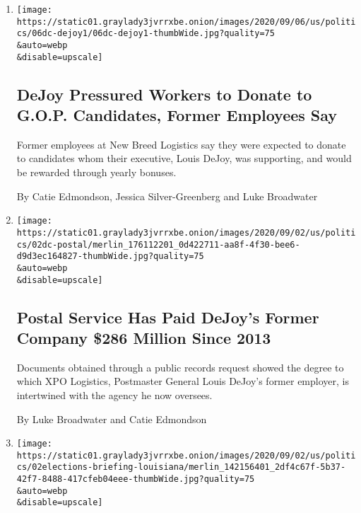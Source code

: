\begin{enumerate}
\def\labelenumi{\arabic{enumi}.}
\item
  \href{/2020/09/06/us/politics/dejoy-political-donations.html}{}

  \texttt{[image: https://static01.graylady3jvrrxbe.onion/images/2020/09/06/us/politics/06dc-dejoy1/06dc-dejoy1-thumbWide.jpg?quality=75\\\&auto=webp\\\&disable=upscale]}

  \hypertarget{dejoy-pressured-workers-to-donate-to-gop-candidates-former-employees-say}{%
  \subsection{DeJoy Pressured Workers to Donate to G.O.P. Candidates,
  Former Employees
  Say}\label{dejoy-pressured-workers-to-donate-to-gop-candidates-former-employees-say}}

  Former employees at New Breed Logistics say they were expected to
  donate to candidates whom their executive, Louis DeJoy, was
  supporting, and would be rewarded through yearly bonuses.

  By Catie Edmondson, Jessica Silver-Greenberg and Luke Broadwater
\item
  \href{/2020/09/02/us/politics/louis-dejoy-usps-paid.html}{}

  \texttt{[image: https://static01.graylady3jvrrxbe.onion/images/2020/09/02/us/politics/02dc-postal/merlin\_176112201\_0d422711-aa8f-4f30-bee6-d9d3ec164827-thumbWide.jpg?quality=75\\\&auto=webp\\\&disable=upscale]}

  \hypertarget{postal-service-has-paid-dejoys-former-company-286-million-since-2013}{%
  \subsection{Postal Service Has Paid DeJoy's Former Company \$286
  Million Since
  2013}\label{postal-service-has-paid-dejoys-former-company-286-million-since-2013}}

  Documents obtained through a public records request showed the degree
  to which XPO Logistics, Postmaster General Louis DeJoy's former
  employer, is intertwined with the agency he now oversees.

  By Luke Broadwater and Catie Edmondson
\item
  \href{/live/2020/09/02/us/trump-vs-biden/a-louisiana-republican-congressman-threatened-to-kill-anyone-arriving-at-a-black-lives-matter-rally-armed}{}

  \texttt{[image: https://static01.graylady3jvrrxbe.onion/images/2020/09/02/us/politics/02elections-briefing-louisiana/merlin\_142156401\_2df4c67f-5b37-42f7-8488-417cfeb04eee-thumbWide.jpg?quality=75\\\&auto=webp\\\&disable=upscale]}


\end{enumerate}
